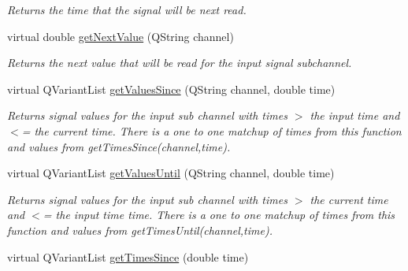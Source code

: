 \begin{DoxyCompactItemize}
\begin{DoxyCompactList}\small\item\em Returns the time that the signal will be next read. \end{DoxyCompactList}\item 
\hypertarget{class_picto_1_1_signal_state_a9793fb05f6d1ded1e0b2d8267157f50b}{virtual double \hyperlink{class_picto_1_1_signal_state_a9793fb05f6d1ded1e0b2d8267157f50b}{get\-Next\-Value} (Q\-String channel)}\label{class_picto_1_1_signal_state_a9793fb05f6d1ded1e0b2d8267157f50b}

\begin{DoxyCompactList}\small\item\em Returns the next value that will be read for the input signal subchannel. \end{DoxyCompactList}\item 
\hypertarget{class_picto_1_1_signal_state_a8a7a6c281950c321b5da203e49a40292}{virtual Q\-Variant\-List \hyperlink{class_picto_1_1_signal_state_a8a7a6c281950c321b5da203e49a40292}{get\-Values\-Since} (Q\-String channel, double time)}\label{class_picto_1_1_signal_state_a8a7a6c281950c321b5da203e49a40292}

\begin{DoxyCompactList}\small\item\em Returns signal values for the input sub channel with times $>$ the input time and $<$= the current time. There is a one to one matchup of times from this function and values from get\-Times\-Since(channel,time). \end{DoxyCompactList}\item 
\hypertarget{class_picto_1_1_signal_state_a6e05d7e957504c88575976c8f3247d2a}{virtual Q\-Variant\-List \hyperlink{class_picto_1_1_signal_state_a6e05d7e957504c88575976c8f3247d2a}{get\-Values\-Until} (Q\-String channel, double time)}\label{class_picto_1_1_signal_state_a6e05d7e957504c88575976c8f3247d2a}

\begin{DoxyCompactList}\small\item\em Returns signal values for the input sub channel with times $>$ the current time and $<$= the input time time. There is a one to one matchup of times from this function and values from get\-Times\-Until(channel,time). \end{DoxyCompactList}\item 
\hypertarget{class_picto_1_1_signal_state_a42f762461cc6f20de0c7f5b64e6eaf12}{virtual Q\-Variant\-List \hyperlink{class_picto_1_1_signal_state_a42f762461cc6f20de0c7f5b64e6eaf12}{get\-Times\-Since} (double time)}\label{class_picto_1_1_signal_state_a42f762461cc6f20de0c7f5b64e6eaf12}


\end{DoxyCompactItemize}
